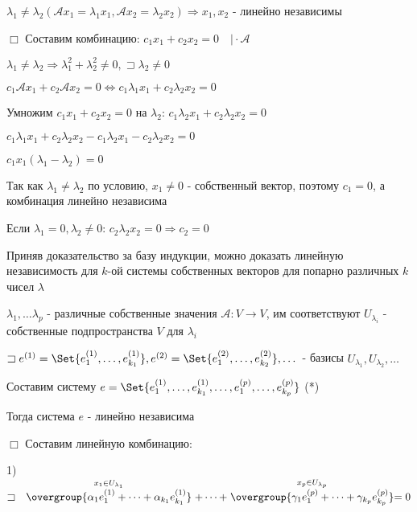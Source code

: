 \documentclass[12pt]{article}
\begin{document}
    \Th $\lambda_1 \neq \lambda_2 (\mathcal{A}x_1 = \lambda_1 x_1, \mathcal{A}x_2 = \lambda_2 x_2) \Longrightarrow x_1, x_2$ - линейно независимы

    $\Box$ Составим комбинацию: $c_1 x_1 + c_2 x_2 = 0 \quad \Big| \cdot \mathcal{A}$

    $\lambda_1 \neq \lambda_2 \Longrightarrow \lambda_1^2 + \lambda_2^2 \neq 0, \sqsupset \lambda_2 \neq 0$

    $c_1 \mathcal{A} x_1 + c_2 \mathcal{A} x_2 = 0 \Longleftrightarrow c_1 \lambda_1 x_1 + c_2 \lambda_2 x_2 = 0$

    Умножим $c_1 x_1 + c_2 x_2 = 0$ на $\lambda_2$: $c_1 \lambda_2 x_1 + c_2 \lambda_2 x_2 = 0$

    $c_1 \lambda_1 x_1 + c_2 \lambda_2 x_2 - c_1 \lambda_2 x_1 - c_2 \lambda_2 x_2 = 0$

    $c_1 x_1(\lambda_1 - \lambda_2) = 0$

    Так как $\lambda_1 \neq \lambda_2$ по условию, $x_1 \neq 0$ - собственный вектор, поэтому $c_1 = 0$, а комбинация линейно независима

    Если $\lambda_1 = 0, \lambda_2 \neq 0$: $c_2 \lambda_2 x_2 = 0 \Longrightarrow c_2 = 0$

    \Nota Приняв доказательство за базу индукции, можно доказать линейную независимость для $k$-ой системы собственных векторов для попарно различных $k$ чисел $\lambda$


    \Th $\lambda_1, \dots \lambda_p$ - различные собственные значения $\mathcal{A} : V \rightarrow V$,
    им соответствуют $U_{\lambda_i}$ - собственные подпространства $V$ для $\lambda_i$

    $\sqsupset e^{(1)} = \Set{e^{(1)}_1, \dots, e^{(1)}_{k_1}}, e^{(2)} = \Set{e^{(2)}_1, \dots, e^{(2)}_{k_2}}, \dots$ -
    базисы $U_{\lambda_1}, U_{\lambda_2}, \dots$

    Составим систему $e = \Set{e^{(1)}_1, \dots, e^{(1)}_{k_1}, \dots, e^{(p)}_1, \dots, e^{(p)}_{k_p}}$ (*)

    Тогда система $e$ - линейно независима

    $\Box$ Составим линейную комбинацию:

    1) $\sqsupset \quad \stackrel{x_1 \in U_{\lambda_1}}{\overgroup{\alpha_1 e^{(1)}_1 + \dots + \alpha_{k_1} e^{(1)}_{k_1}}} + \dots +
    \stackrel{x_p \in U_{\lambda_p}}{\overgroup{\gamma_1 e^{(p)}_1 + \dots + \gamma_{k_p} e^{(p)}_{k_p}}} = 0$
\end{document}
